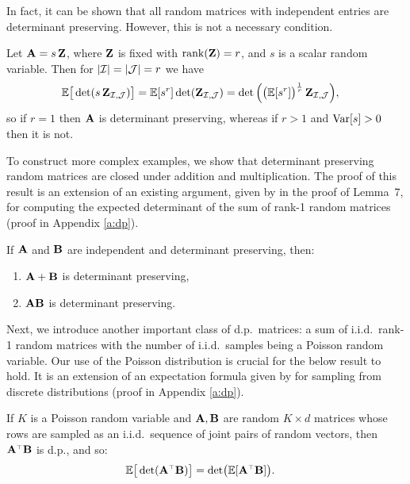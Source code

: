 \documentclass[11pt]{article}
\begin{document}
\noindent
In fact, it can be shown that all random matrices with independent entries
are determinant preserving. However, this is not a necessary condition.
\begin{example}\label{e:rank-1}
Let $\mathbf A = s\,\mathbf Z$, where $\mathbf Z$ is fixed with $\mathrm{rank}(\mathbf Z) = r$, and $s$
is a scalar random variable. Then for $|\mathcal I|=|\mathcal{J}|=r$ we have
\begin{align*}
  \mathbb E\big[\det(s\,\mathbf Z_{\mathcal I,\mathcal{J}})\big] &= \mathbb E[s^r]\det(\mathbf Z_{\mathcal I,\mathcal{J}})
                                      =\det\Big(\big(\mathbb E[s^r]\big)^{\frac1r}\,\mathbf Z_{\mathcal I,\mathcal{J}}\Big),
\end{align*}
  so if $r=1$ then $\mathbf A$ is determinant preserving, whereas if $r>1$
  and $\mathrm{Var}[s]>0$ then it is not.
\end{example}

\noindent
To construct more complex examples, we show that determinant preserving random matrices are
closed under addition and multiplication. The proof of this result is
an extension of an existing argument, given by
\cite{determinantal-averaging} in the proof of Lemma~7, for computing
the expected determinant of the sum of rank-1 random matrices (proof in Appendix \ref{a:dp}). 
\begin{lemma}\label{t:ring}
  If $\mathbf A$ and $\mathbf B$ are independent and determinant preserving, then:
  \begin{enumerate}
  \item $\mathbf A+\mathbf B$ is determinant preserving,
  \item $\mathbf A\mathbf B$ is determinant preserving.
    \end{enumerate}
\end{lemma}

\noindent
Next, we introduce another important class of d.p.~matrices:
a sum of i.i.d.~rank-1 random matrices with the number of
i.i.d.~samples being a Poisson random variable. Our use of the Poisson
distribution is crucial for the below result to hold. It is an
extension of an expectation formula given by \cite{dpp-intermediate}
for sampling from discrete distributions (proof in Appendix \ref{a:dp}).
\begin{lemma}\label{l:poisson}
If $K$ is a Poisson random variable and $\mathbf A,\mathbf B$ are random $K\times d$
matrices whose rows  are sampled as an i.i.d.~sequence of joint pairs of
random vectors, then $\A^\top\B$ is d.p., and so:
\begin{align*}
  \E\big[\det(\A^\top\B)\big] &= \det\!\big(\E[\A^\top\B]\big).
  \end{align*}
\end{lemma}
\end{document}
